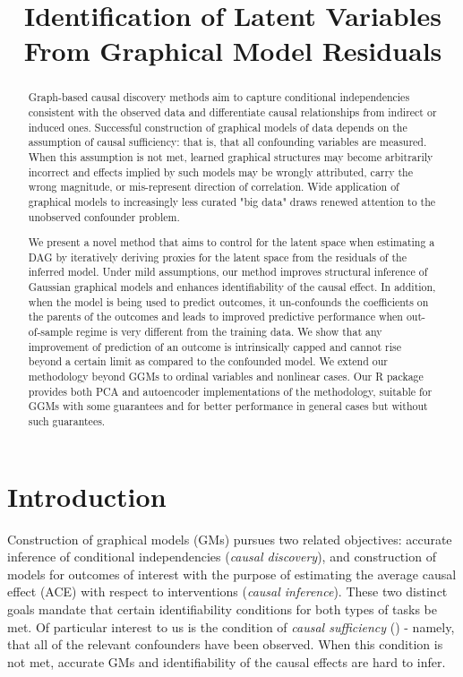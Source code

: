 \documentclass[letterpaper]{article}
\title{Identification of Latent Variables From Graphical Model Residuals}
\begin{document}
\maketitle

\begin{abstract}
Graph-based causal discovery methods aim to capture conditional independencies consistent with the observed data and differentiate causal relationships from indirect or induced ones.  Successful construction of graphical models of data depends on the assumption of causal sufficiency: that is, that all confounding variables are measured. When this assumption is not met, learned graphical structures may become arbitrarily incorrect and effects implied by such models may be wrongly attributed, carry the wrong magnitude, or mis-represent direction of correlation.  Wide application of graphical models to increasingly less curated "big data" draws renewed attention to the unobserved confounder problem.  

We present a novel method that aims to control for the latent space when estimating a DAG by iteratively deriving proxies for the latent space from the residuals of the inferred model.  Under mild assumptions, our method improves structural inference of Gaussian graphical models and enhances identifiability of the causal effect. In addition, when the model is being used to predict outcomes, it un-confounds the coefficients on the parents of the outcomes and leads to improved predictive performance when out-of-sample regime is very different from the training data.  We show that any improvement of prediction of an outcome is intrinsically capped and cannot rise beyond a certain limit as compared to the confounded model.  We extend our methodology beyond GGMs to ordinal variables and nonlinear cases.  Our R package provides both PCA and autoencoder implementations of the methodology, suitable for GGMs with some guarantees and for better performance in general cases but without such guarantees. 
\end{abstract}

\section{Introduction}
\label{introduction}

Construction of graphical models (GMs) pursues two related objectives:
accurate inference of conditional independencies (\textit{causal
  discovery}), and construction of models for outcomes of interest
with the purpose of estimating the average causal effect (ACE) with
respect to interventions \cite{pearl_causality:_2000,hernan_estimating_2006} (\textit{causal inference}).  These two distinct goals mandate that certain identifiability conditions for both types of tasks be met.  Of particular interest to us is the condition of \textit{causal sufficiency} (\cite{spirtes_causation_1993}) - namely, that all of the relevant confounders have been observed.  When this condition is not met, accurate GMs and identifiability of the causal effects are hard to infer.
\end{document}
